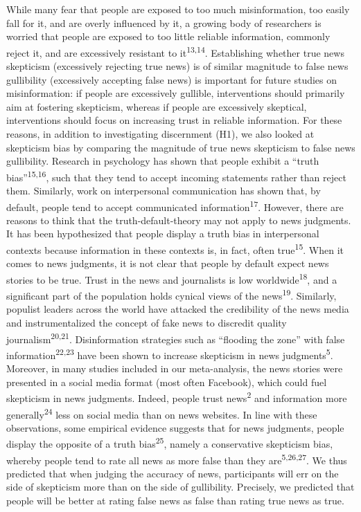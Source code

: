 \documentclass[
  doc,floatsintext]{apa6}
\begin{document}
While many fear that people are exposed to too much misinformation, too easily fall for it, and are overly influenced by it, a growing body of researchers is worried that people are exposed to too little reliable information, commonly reject it, and are excessively resistant to it\textsuperscript{13,14}. Establishing whether true news skepticism (excessively rejecting true news) is of similar magnitude to false news gullibility (excessively accepting false news) is important for future studies on misinformation: if people are excessively gullible, interventions should primarily aim at fostering skepticism, whereas if people are excessively skeptical, interventions should focus on increasing trust in reliable information. For these reasons, in addition to investigating discernment (H1), we also looked at skepticism bias by comparing the magnitude of true news skepticism to false news gullibility. Research in psychology has shown that people exhibit a ``truth bias''\textsuperscript{15,16}, such that they tend to accept incoming statements rather than reject them. Similarly, work on interpersonal communication has shown that, by default, people tend to accept communicated information\textsuperscript{17}. However, there are reasons to think that the truth-default-theory may not apply to news judgments. It has been hypothesized that people display a truth bias in interpersonal contexts because information in these contexts is, in fact, often true\textsuperscript{15}. When it comes to news judgments, it is not clear that people by default expect news stories to be true. Trust in the news and journalists is low worldwide\textsuperscript{18}, and a significant part of the population holds cynical views of the news\textsuperscript{19}. Similarly, populist leaders across the world have attacked the credibility of the news media and instrumentalized the concept of fake news to discredit quality journalism\textsuperscript{20,21}. Disinformation strategies such as ``flooding the zone'' with false information\textsuperscript{22,23} have been shown to increase skepticism in news judgments\textsuperscript{5}. Moreover, in many studies included in our meta-analysis, the news stories were presented in a social media format (most often Facebook), which could fuel skepticism in news judgments. Indeed, people trust news\textsuperscript{2} and information more generally\textsuperscript{24} less on social media than on news websites. In line with these observations, some empirical evidence suggests that for news judgments, people display the opposite of a truth bias\textsuperscript{25}, namely a conservative skepticism bias, whereby people tend to rate all news as more false than they are\textsuperscript{5,26,27}. We thus predicted that when judging the accuracy of news, participants will err on the side of skepticism more than on the side of gullibility. Precisely, we predicted that people will be better at rating false news as false than rating true news as true.
\end{document}
